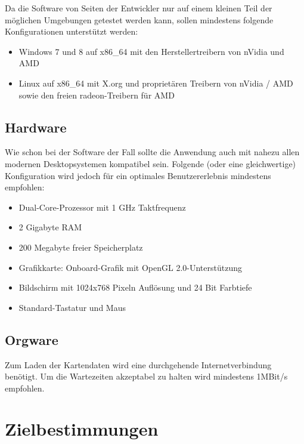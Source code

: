 \documentclass[10pt]{scrreprt}
\begin{document}
Da die Software von Seiten der Entwickler nur auf einem kleinen Teil der möglichen Umgebungen getestet werden kann, sollen mindestens folgende Konfigurationen unterstützt werden:
\begin{itemize}
\item Windows 7 und 8 auf x86{\_}64 mit den Herstellertreibern von nVidia und AMD
\item Linux auf x86{\_}64 mit X.org und proprietären Treibern von nVidia / AMD sowie den freien radeon-Treibern für AMD
\end{itemize}


\section{Hardware}
Wie schon bei der Software der Fall sollte die Anwendung auch mit nahezu allen modernen Desktopsystemen kompatibel sein. Folgende (oder eine gleichwertige) Konfiguration wird jedoch für ein optimales Benutzererlebnis mindestens empfohlen:
\begin{itemize}
\item Dual-Core-Prozessor mit 1 GHz Taktfrequenz
\item 2 Gigabyte RAM
\item 200 Megabyte freier Speicherplatz
\item Grafikkarte: Onboard-Grafik mit OpenGL 2.0-Unterstützung
\item Bildschirm mit 1024x768 Pixeln Auflösung und 24 Bit Farbtiefe
\item Standard-Tastatur und Maus
\end{itemize}



\section{Orgware}
Zum Laden der Kartendaten wird eine durchgehende Internetverbindung benötigt. Um die Wartezeiten akzeptabel zu halten wird mindestens 1MBit/s empfohlen.




\chapter{Zielbestimmungen}
\end{document}

